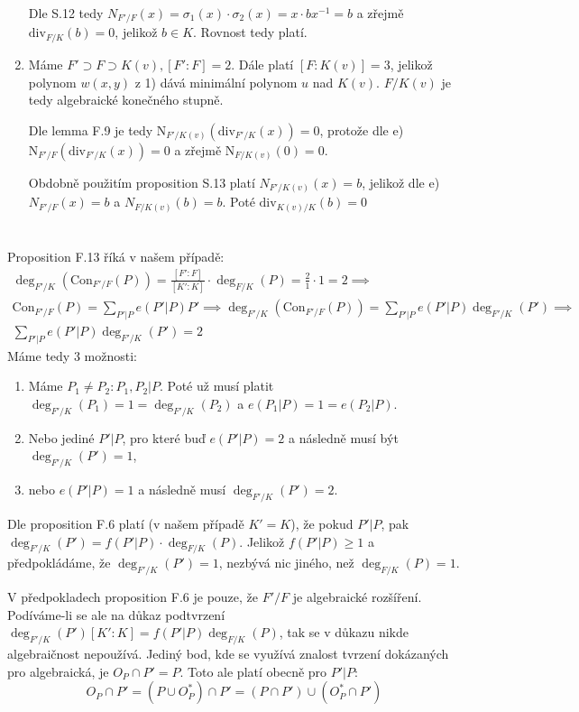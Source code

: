 \documentclass[12pt, a4paper]{article}
\begin{document}
\begin{enumerate}[label=(\alph*)]
    Dle S.12 tedy $N_{F'/F}(x)=\sigma_1(x)\cdot \sigma_2(x) = x \cdot bx^{-1} = b$ a zřejmě $\text{div}_{F/K}(b) = 0$, jelikož $b \in K$. Rovnost tedy platí.

    \item Máme $F' \supset F \supset K(v), [F':F]=2$. Dále platí $[F:K(v)]=3$, jelikož polynom $w(x,y)$ z 1) dává minimální polynom $u$ nad $K(v)$. $F/K(v)$ je tedy algebraické konečného stupně.

    Dle lemma F.9 je tedy $\text{N}_{F'/K(v)}(\text{div}_{F'/K}(x)) = 0$, protože dle e) $\text{N}_{F'/F}(\text{div}_{F'/K}(x)) = 0$ a zřejmě $\text{N}_{F/K(v)}(0) = 0$. 

    Obdobně použitím proposition S.13 platí $N_{F'/K(v)}(x) = b$, jelikož dle e) $N_{F'/F}(x) = b$ a $N_{F/K(v)}(b) = b$. Poté $\text{div}_{K(v)/K}(b) = 0$
\end{enumerate}

\section{}
Proposition F.13 říká v našem případě:
\begin{gather*}
\deg_{F'/K}(\text{Con}_{F'/F}(P)) = \frac{[F':F]}{[K':K]}\cdot \deg_{F/K}(P) = \frac{2}{1} \cdot 1 = 2 \implies\\
\text{Con}_{F'/F}(P) = \sum\limits_{P'|P}e(P'|P)P' \implies \deg_{F'/K}(\text{Con}_{F'/F}(P)) = \sum\limits_{P'|P}e(P'|P)\deg_{F'/K}(P') \implies\\
\sum\limits_{P'|P}e(P'|P)\deg_{F'/K}(P') = 2
\end{gather*}
Máme tedy 3 možnosti:

\begin{enumerate}
    \item Máme $P_1 \neq P_2: P_1, P_2 | P$. Poté už musí platit $\deg_{F'/K}(P_1)=1=\deg_{F'/K}(P_2)$ a $e(P_1|P)=1=e(P_2|P)$.
    \item Nebo jediné $P' | P$, pro které buď $e(P'|P)=2$ a následně musí být $\deg_{F'/K}(P')=1$,
    \item nebo $e(P'|P)=1$ a následně musí $\deg_{F'/K}(P')=2$.
\end{enumerate}

Dle proposition F.6 platí (v našem případě $K'=K$), že pokud $P'|P$, pak $\deg_{F'/K}(P') = f(P'|P)\cdot \deg_{F/K}(P)$. Jelikož $f(P'|P) \geq 1$ a předpokládáme, že $\deg_{F'/K}(P')=1$, nezbývá nic jiného, než $\deg_{F/K}(P) = 1$.

V předpokladech proposition F.6 je pouze, že $F'/F$ je algebraické rozšíření. Podíváme-li se ale na důkaz podtvrzení $\deg_{F'/K}(P')[K':K] = f(P'|P)\deg_{F/K}(P)$, tak se v důkazu nikde algebraičnost nepoužívá. Jediný bod, kde se využívá znalost tvrzení dokázaných pro algebraická, je $O_P \cap P' = P$. Toto ale platí obecně pro $P'|P$:
\[O_P \cap P' = (P \cup O^*_P) \cap P' = (P \cap P') \cup (O^*_P \cap P') \]
\end{document}
